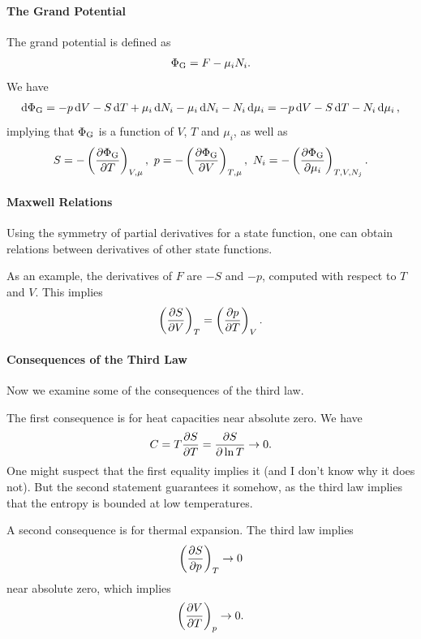 \paragraph{The Grand Potential}
The grand potential is defined as
\begin{align*}
	\Phi_{\text{G}} = F - \mu_{i}N_{i}.
\end{align*}
We have
\begin{align*}
	\dd{\Phi_{\text{G}}} = -p\dd{V} - S\dd{T} + \mu_{i}\dd{N_{i}} - \mu_{i}\dd{N_{i}} - N_{i}\dd{\mu_{i}} = -p\dd{V} - S\dd{T} - N_{i}\dd{\mu_{i}},
\end{align*}
implying that $\Phi_{\text{G}}$ is a function of $V$, $T$ and $\mu_{i}$, as well as
\begin{align*}
	S = - \left(\pdv{\Phi_{\text{G}}}{T}\right)_{V, \mu},\ p = - \left(\pdv{\Phi_{\text{G}}}{V}\right)_{T, \mu},\ N_{i} = - \left(\pdv{\Phi_{\text{G}}}{\mu_{i}}\right)_{T, V, N_{j}}.
\end{align*}

\paragraph{Maxwell Relations}
Using the symmetry of partial derivatives for a state function, one can obtain relations between derivatives of other state functions.

As an example, the derivatives of $F$ are $-S$ and $-p$, computed with respect to $T$ and $V$. This implies
\begin{align*}
	\left(\pdv{S}{V}\right)_{T} = \left(\pdv{p}{T}\right)_{V}.
\end{align*}

\paragraph{Consequences of the Third Law}
Now we examine some of the consequences of the third law.

The first consequence is for heat capacities near absolute zero. We have
\begin{align*}
	C = T\pdv{S}{T} = \pdv{S}{\ln{T}} \to 0.
\end{align*}
One might suspect that the first equality implies it (and I don't know why it does not). But the second statement guarantees it somehow, as the third law implies that the entropy is bounded at low temperatures.

A second consequence is for thermal expansion. The third law implies
\begin{align*}
	\left(\pdv{S}{p}\right)_{T} \to 0
\end{align*}
near absolute zero, which implies
\begin{align*}
	\left(\pdv{V}{T}\right)_{p} \to 0.
\end{align*}

